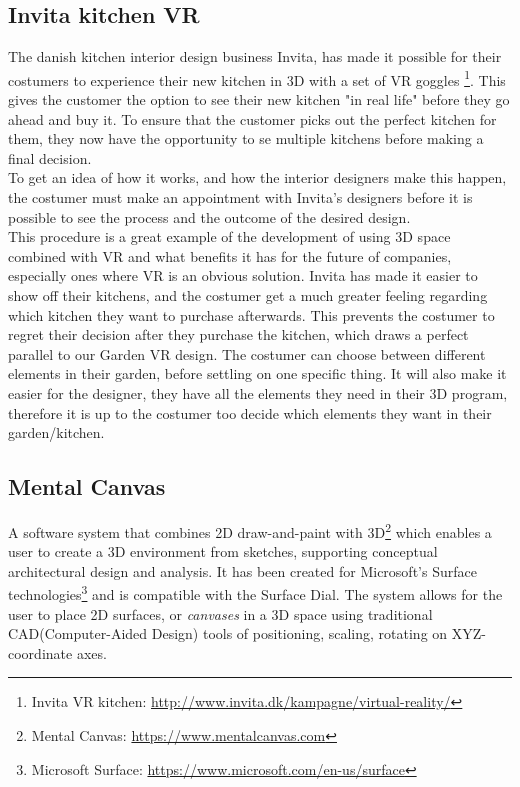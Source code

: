 		\subsection{Invita kitchen VR}
			The danish kitchen interior design business Invita, has made it possible for their costumers to experience their new kitchen in 3D with a set of VR goggles \footnote{Invita VR kitchen: \url{http://www.invita.dk/kampagne/virtual-reality/}}. This gives the customer the option to see their new kitchen "in real life" before they go ahead and buy it. To ensure that the customer picks out the perfect kitchen for them, they now have the opportunity to se multiple kitchens before making a final decision.\\
			To get an idea of how it works, and how the interior designers make this happen, the costumer must make an appointment with Invita's designers before it is possible to see the process and the outcome of the desired design.\\
			This procedure is a great example of the development of using 3D space combined with VR and what benefits it has for the future of companies, especially ones where VR is an obvious solution. Invita has made it easier to show off their kitchens, and the costumer get a much greater feeling regarding which kitchen they want to purchase afterwards. This prevents the costumer to regret their decision after they purchase the kitchen, which draws a perfect parallel to our Garden VR design. The costumer can choose between different elements in their garden, before settling on one specific thing. It will also make it easier for the designer, they have all the elements they need in their 3D program, therefore it is up to the costumer too decide which elements they want in their garden/kitchen.

			
		\subsection{Mental Canvas}
			A software system that combines 2D draw-and-paint with 3D\footnote{Mental Canvas: \url{https://www.mentalcanvas.com}} which enables a user to create a 3D environment from sketches, supporting conceptual architectural design and analysis. It has been created for Microsoft's Surface technologies\footnote{Microsoft Surface: \url{https://www.microsoft.com/en-us/surface}} and is compatible with the Surface Dial. The system allows for the user to place 2D surfaces, or \textit{canvases} in a 3D space using traditional CAD(Computer-Aided Design) tools of positioning, scaling, rotating on XYZ-coordinate axes.\cite{sotaMentalCanvas}
			
